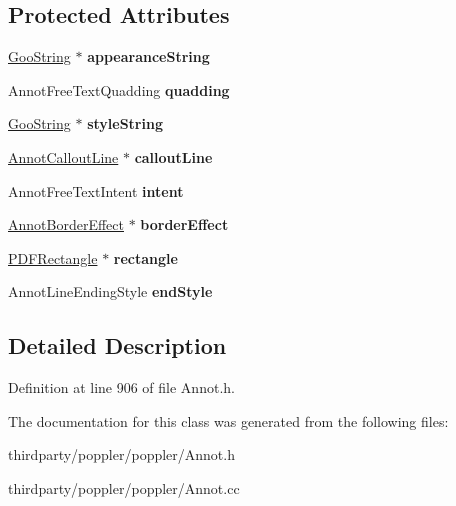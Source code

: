 \subsection*{Protected Attributes}
\begin{DoxyCompactItemize}
\item 
\mbox{\label{class_annot_free_text_ae49d855b9ee5dec17045e94a28db0eae}} 
\hyperlink{class_goo_string}{Goo\+String} $\ast$ {\bfseries appearance\+String}
\item 
\mbox{\label{class_annot_free_text_a56683e3e455631ba86b3a2920d97090f}} 
Annot\+Free\+Text\+Quadding {\bfseries quadding}
\item 
\mbox{\label{class_annot_free_text_ad1382c4bb31d535527e744d617747e9f}} 
\hyperlink{class_goo_string}{Goo\+String} $\ast$ {\bfseries style\+String}
\item 
\mbox{\label{class_annot_free_text_a98b414022118a3f4be5328611ec9d4c7}} 
\hyperlink{class_annot_callout_line}{Annot\+Callout\+Line} $\ast$ {\bfseries callout\+Line}
\item 
\mbox{\label{class_annot_free_text_a804e390d55dd3d91d3fd9a2c9c0ce9b5}} 
Annot\+Free\+Text\+Intent {\bfseries intent}
\item 
\mbox{\label{class_annot_free_text_ae3b661eb2f19bce4a16d76744d21766e}} 
\hyperlink{class_annot_border_effect}{Annot\+Border\+Effect} $\ast$ {\bfseries border\+Effect}
\item 
\mbox{\label{class_annot_free_text_a7f4ce4535b85eb0ca2165edfffc94f68}} 
\hyperlink{class_p_d_f_rectangle}{P\+D\+F\+Rectangle} $\ast$ {\bfseries rectangle}
\item 
\mbox{\label{class_annot_free_text_a122a4e2a82e9e1d1efb1a1670a1b2b3c}} 
Annot\+Line\+Ending\+Style {\bfseries end\+Style}
\end{DoxyCompactItemize}


\subsection{Detailed Description}


Definition at line 906 of file Annot.\+h.



The documentation for this class was generated from the following files\+:\begin{DoxyCompactItemize}
\item 
thirdparty/poppler/poppler/Annot.\+h\item 
thirdparty/poppler/poppler/Annot.\+cc\end{DoxyCompactItemize}
